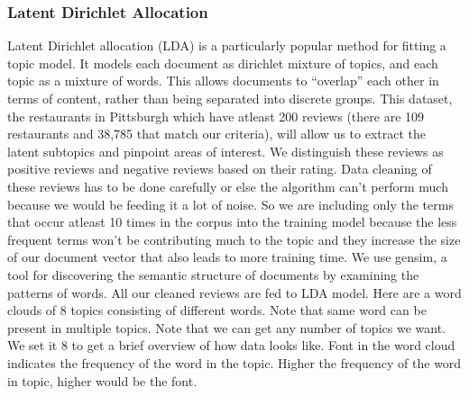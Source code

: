 \documentclass{neu_handout}
\begin{document}
\subsubsection*{Latent Dirichlet Allocation}
Latent Dirichlet allocation (LDA) is a particularly popular method for fitting a topic model. It models each document as dirichlet mixture of topics, and each topic as a mixture of words. This allows documents to “overlap” each other in terms of content, rather than being separated into discrete groups.
This dataset, the restaurants in Pittsburgh which have atleast 200 reviews (there are 109 restaurants and 38,785 that match our criteria), will allow us to extract the latent subtopics and pinpoint areas of interest. We distinguish these reviews as positive reviews and negative reviews based on their rating. Data cleaning of these reviews has to be done carefully or else the algorithm can't perform much because we would be feeding it a lot of noise. So we are including only the terms that occur atleast 10 times in the corpus into the training model because the less frequent terms won't be contributing much to the topic and they increase the size of our document vector that also leads to more training time. We use gensim, a tool for discovering the semantic structure of documents by examining the patterns of words. All our cleaned reviews are fed to LDA model. Here are a word clouds of 8 topics consisting of different words. Note that same word can be present in multiple topics.
Note that we can get any number of topics we want. We set it 8 to get a brief overview of how data looks like. Font in the word cloud indicates the frequency of the word in the topic. Higher the frequency of the word in topic, higher would be the font.
\end{document}
